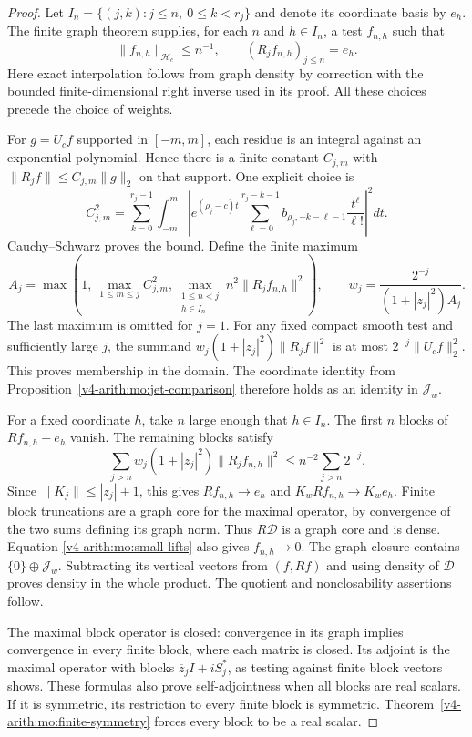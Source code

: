 \begin{proof}
Let $I_n=\{(j,k):j\leq n,\ 0\leq k<r_j\}$ and denote its
coordinate basis by $e_h$. The finite graph theorem supplies,
for each $n$ and $h\in I_n$, a test $f_{n,h}$ such that
\begin{equation}
 \|f_{n,h}\|_{\mathscr H_c}\leq n^{-1},\qquad
 (R_jf_{n,h})_{j\leq n}=e_h.
 \label{v4-arith:mo:small-lifts}
\end{equation}
Here exact interpolation follows from graph density by correction
with the bounded finite-dimensional right inverse used in its proof.
All these choices precede the choice of weights.

For $g=U_cf$ supported in $[-m,m]$, each residue is an integral
against an exponential polynomial. Hence there is a finite
constant $C_{j,m}$ with
$\|R_jf\|\leq C_{j,m}\|g\|_2$ on that support.
One explicit choice is
\[
 C_{j,m}^2=\sum_{k=0}^{r_j-1}\int_{-m}^m
 \left|e^{(\rho_j-c)t}
 \sum_{\ell=0}^{r_j-k-1}
 b_{\rho_j,-k-\ell-1}\frac{t^\ell}{\ell!}\right|^2dt.
\]
Cauchy--Schwarz proves the bound. Define the finite maximum
\[
 A_j=\max\left(
 1,\ \max_{1\leq m\leq j}C_{j,m}^2,
 \max_{\substack{1\leq n<j\\h\in I_n}}
                  n^2\|R_jf_{n,h}\|^2\right),
 \qquad
 w_j=\frac{2^{-j}}{(1+|z_j|^2)A_j}.
\]
The last maximum is omitted for $j=1$.
For any fixed compact smooth test and sufficiently large $j$,
the summand $w_j(1+|z_j|^2)\|R_jf\|^2$ is at most
$2^{-j}\|U_cf\|_2^2$. This proves membership in the domain.
The coordinate identity from Proposition~\ref{v4-arith:mo:jet-comparison} therefore
holds as an identity in $\mathscr J_w$.

For a fixed coordinate $h$, take $n$ large enough that $h\in I_n$.
The first $n$ blocks of $Rf_{n,h}-e_h$ vanish. The remaining
blocks satisfy
\[
 \sum_{j>n}w_j(1+|z_j|^2)\|R_jf_{n,h}\|^2
 \leq n^{-2}\sum_{j>n}2^{-j}.
\]
Since $\|K_j\|\leq |z_j|+1$, this gives
$Rf_{n,h}\to e_h$ and $K_wRf_{n,h}\to K_we_h$.
Finite block truncations are a graph core for the maximal operator,
by convergence of the two sums defining its graph norm.
Thus $R\mathscr D$ is a graph core and is dense.
Equation \eqref{v4-arith:mo:small-lifts} also gives $f_{n,h}\to0$.
The graph closure contains $\{0\}\oplus\mathscr J_w$.
Subtracting its vertical vectors from $(f,Rf)$ and using density
of $\mathscr D$ proves density in the whole product.
The quotient and nonclosability assertions follow.

The maximal block operator is closed: convergence in its graph
implies convergence in every finite block, where each matrix is
closed. Its adjoint is the maximal operator with blocks
$\overline z_jI+iS_j^*$, as testing against finite block vectors
shows. These formulas also prove self-adjointness when all blocks
are real scalars. If it is symmetric, its restriction to every
finite block is symmetric. Theorem~\ref{v4-arith:mo:finite-symmetry} forces every
block to be a real scalar.


\end{proof}
